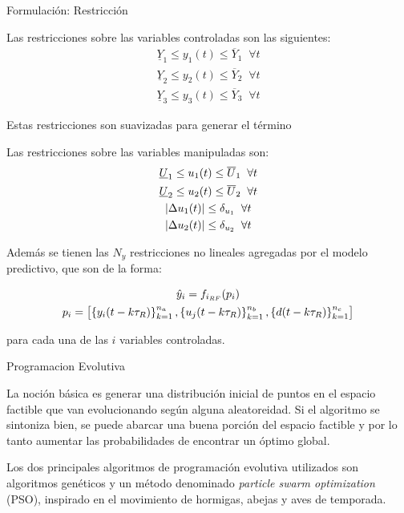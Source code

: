 \documentclass{beamer}
\begin{document}
\begin{myFrame}{Formulación: Restricción}

Las restricciones sobre las variables controladas son las siguientes:
\bseq{}\label{eq:restriccionesMPC_CV}
\begin{gather}
\underline{Y}_1 \leq y_{1}(t) \leq \overline{Y}_1 \;\;\forall t\\
\underline{Y}_2 \leq y_{2}(t) \leq \overline{Y}_2 \;\;\forall t\\
\underline{Y}_3 \leq y_{3}(t) \leq \overline{Y}_3 \;\;\forall t
\end{gather}
\eseq{}

Estas restricciones son suavizadas para generar el término
\framebreak

Las restricciones sobre las variables manipuladas son:
\bseq{}\label{eq:restriccionesMPC_MV}
\begin{gather}
\underline{U}_1 \leq u_{1}(t) \leq \overline{U}_1 \;\;\forall t\\
\underline{U}_2 \leq u_{2}(t) \leq \overline{U}_2 \;\;\forall t\\
\left\lvert \Delta u_{1}(t) \right\rvert \leq \delta_{u_1} \;\;\forall t\\
\left\lvert \Delta u_{2}(t) \right\rvert \leq \delta_{u_2} \;\;\forall t\\
\end{gather}
\eseq{}

Además se tienen las $N_y$ restricciones no lineales agregadas por el modelo predictivo, que son de la forma:

\bseq{}\label{eq:restriccionesMPC_RF}
\begin{gather}
\hat{y}_i = f_{i_{RF}}(p_i)\\
p_i = \left[ \left\lbrace y_i(t-k\tau_R) \right\rbrace_{k = 1}^{n_a},\left\lbrace u_j(t-k\tau_R) \right\rbrace_{k = 1}^{n_b},\left\lbrace d(t-k\tau_R) \right\rbrace_{k = 1}^{n_c} \right]
\end{gather}
\eseq{}

para cada una de las $i$ variables controladas.
\end{myFrame}
\begin{myFrame}{Programacion Evolutiva}

La noción básica es generar una distribución inicial de puntos en el espacio factible que van evolucionando según alguna aleatoreidad. Si el algoritmo se sintoniza bien, se puede abarcar una buena porción del espacio factible y por lo tanto aumentar las probabilidades de encontrar un óptimo global.

\framebreak

Los dos principales algoritmos de programación evolutiva utilizados son algoritmos genéticos y un método denominado \textit{particle swarm optimization} (PSO), inspirado en el movimiento de hormigas, abejas y aves de temporada.

\end{myFrame}
\end{document}
